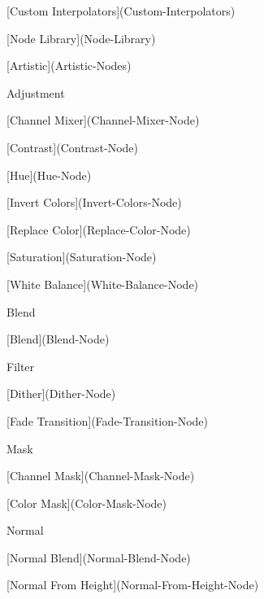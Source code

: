 \begin{DoxyItemize}
\begin{DoxyItemize}
\item \mbox{[}Custom Interpolators\mbox{]}(Custom-\/\+Interpolators)
\end{DoxyItemize}
\item \mbox{[}Node Library\mbox{]}(Node-\/\+Library)
\begin{DoxyItemize}
\item \mbox{[}Artistic\mbox{]}(Artistic-\/\+Nodes)
\begin{DoxyItemize}
\item Adjustment
\begin{DoxyItemize}
\item \mbox{[}Channel Mixer\mbox{]}(Channel-\/\+Mixer-\/\+Node)
\item \mbox{[}Contrast\mbox{]}(Contrast-\/\+Node)
\item \mbox{[}Hue\mbox{]}(Hue-\/\+Node)
\item \mbox{[}Invert Colors\mbox{]}(Invert-\/\+Colors-\/\+Node)
\item \mbox{[}Replace Color\mbox{]}(Replace-\/\+Color-\/\+Node)
\item \mbox{[}Saturation\mbox{]}(Saturation-\/\+Node)
\item \mbox{[}White Balance\mbox{]}(White-\/\+Balance-\/\+Node)
\end{DoxyItemize}
\item Blend
\begin{DoxyItemize}
\item \mbox{[}Blend\mbox{]}(Blend-\/\+Node)
\end{DoxyItemize}
\item Filter
\begin{DoxyItemize}
\item \mbox{[}Dither\mbox{]}(Dither-\/\+Node)
\item \mbox{[}Fade Transition\mbox{]}(Fade-\/\+Transition-\/\+Node)
\end{DoxyItemize}
\item Mask
\begin{DoxyItemize}
\item \mbox{[}Channel Mask\mbox{]}(Channel-\/\+Mask-\/\+Node)
\item \mbox{[}Color Mask\mbox{]}(Color-\/\+Mask-\/\+Node)
\end{DoxyItemize}
\item Normal
\begin{DoxyItemize}
\item \mbox{[}Normal Blend\mbox{]}(Normal-\/\+Blend-\/\+Node)
\item \mbox{[}Normal From Height\mbox{]}(Normal-\/\+From-\/\+Height-\/\+Node)

\end{DoxyItemize}
\end{DoxyItemize}
\end{DoxyItemize}
\end{DoxyItemize}
